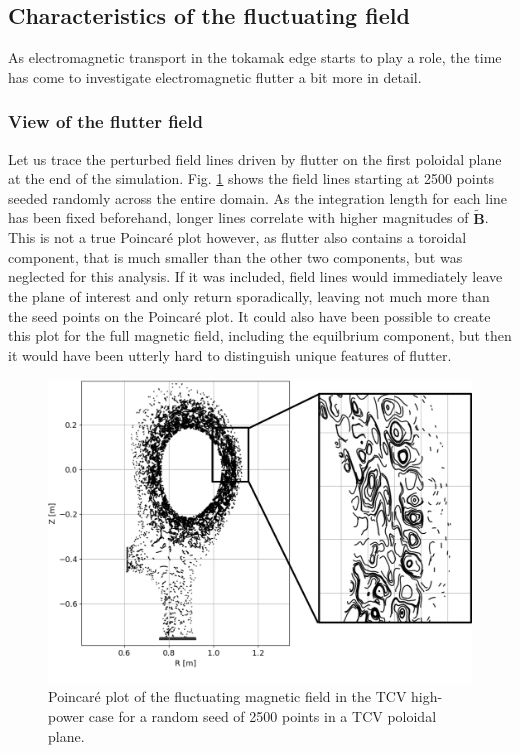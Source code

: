 \subsection{Characteristics of the fluctuating field}

As electromagnetic transport in the tokamak edge starts to play a role, the time has come to investigate electromagnetic flutter a bit more in detail. 

\subsubsection{View of the flutter field}


Let us trace the perturbed field lines driven by flutter on the first poloidal plane at the end of the simulation. Fig. \ref{fig:TCV_poincareFlutter} shows the field lines starting at 2500 points seeded randomly across the entire domain. As the integration length for each line has been fixed beforehand, longer lines correlate with higher magnitudes of $\mathbf{\tilde{B}}$. This is not a true Poincaré plot however, as flutter also contains a toroidal component, that is much smaller than the other two components, but was neglected for this analysis. If it was included, field lines would immediately leave the plane of interest and only return sporadically, leaving not much more than the seed points on the Poincaré plot. It could also have been possible to create this plot for the full magnetic field, including the equilbrium component, but then it would have been utterly hard to distinguish unique features of flutter. \newline 

\begin{figure}[H]\centering
	\centering
	\includegraphics[width=1\textwidth]{schemes/poincareFlutterHighPower.png}
	\caption[Poincaré plot of the fluctuating magnetic field in the TCV high-power case for a random seed of 2500 points in a TCV poloidal plane]{Poincaré plot of the fluctuating magnetic field in the TCV high-power case for a random seed of 2500 points in a TCV poloidal plane.}
	\label{fig:TCV_poincareFlutter}	
\end{figure}


